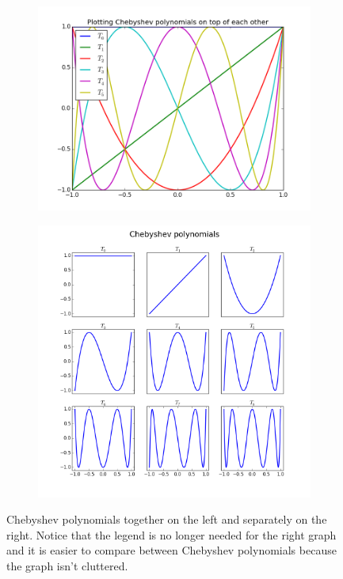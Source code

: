 \begin{figure}
\centering
\begin{subfigure}{.45\textwidth}
  \centering
  \includegraphics[width=\textwidth]{PoT.png}
\end{subfigure}
\begin{subfigure}{.45\textwidth}
\centering
  \includegraphics[width=\textwidth]{PoT_separate.png}
\end{subfigure}
\caption{Chebyshev polynomials together on the left and separately on the right. Notice that the legend is no longer needed for the right graph and it is easier to compare between Chebyshev polynomials because the graph isn't cluttered.}
\label{fig:PoT}
\end{figure}

